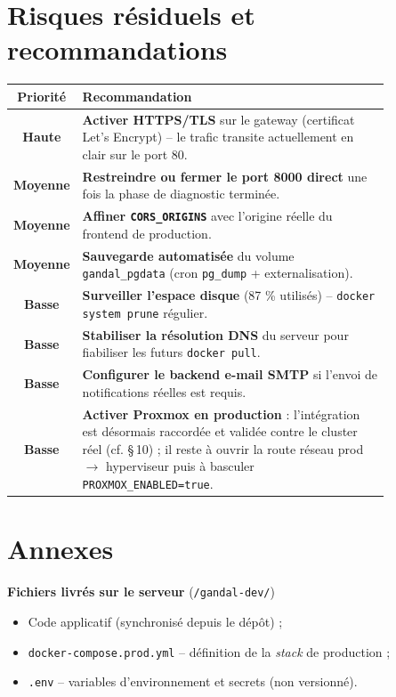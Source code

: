 \documentclass[11pt,a4paper]{article}
\newcommand{\code}[1]{\texttt{\small #1}}
\begin{document}
\section{Risques résiduels et recommandations}

\begin{longtable}{@{}c >{\raggedright\arraybackslash}p{0.84\linewidth}@{}}
\toprule
\textbf{Priorité} & \textbf{Recommandation} \\
\midrule
\endhead
\textcolor{danger}{\textbf{Haute}} & \textbf{Activer HTTPS/TLS} sur le gateway
(certificat Let's Encrypt) -- le trafic transite actuellement en clair sur le port 80. \\
\textcolor{warn}{\textbf{Moyenne}} & \textbf{Restreindre ou fermer le port 8000 direct}
une fois la phase de diagnostic terminée. \\
\textcolor{warn}{\textbf{Moyenne}} & \textbf{Affiner \code{CORS\_ORIGINS}} avec l'origine
réelle du frontend de production. \\
\textcolor{warn}{\textbf{Moyenne}} & \textbf{Sauvegarde automatisée} du volume
\code{gandal\_pgdata} (cron \code{pg\_dump} + externalisation). \\
\textcolor{ok}{\textbf{Basse}} & \textbf{Surveiller l'espace disque} (87 \% utilisés) --
\code{docker system prune} régulier. \\
\textcolor{ok}{\textbf{Basse}} & \textbf{Stabiliser la résolution DNS} du serveur pour
fiabiliser les futurs \code{docker pull}. \\
\textcolor{ok}{\textbf{Basse}} & \textbf{Configurer le backend e-mail SMTP} si l'envoi de
notifications réelles est requis. \\
\textcolor{ok}{\textbf{Basse}} & \textbf{Activer Proxmox en production} : l'intégration est
désormais raccordée et validée contre le cluster réel (cf. \S\,10) ; il reste à ouvrir la
route réseau prod $\rightarrow$ hyperviseur puis à basculer \code{PROXMOX\_ENABLED=true}. \\
\bottomrule
\end{longtable}

\section{Annexes}

\textbf{Fichiers livrés sur le serveur} (\code{/gandal-dev/})
\begin{itemize}
  \item Code applicatif (synchronisé depuis le dépôt) ;
  \item \code{docker-compose.prod.yml} -- définition de la \emph{stack} de production ;
  \item \code{.env} -- variables d'environnement et secrets (non versionné).
\end{itemize}
\end{document}
